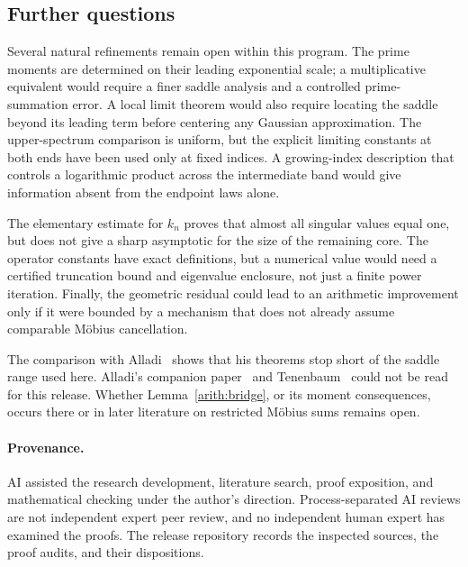 \subsection{Further questions}

Several natural refinements remain open within this program. The prime moments are determined on their leading exponential scale; a multiplicative equivalent would require a finer saddle analysis and a controlled prime-summation error. A local limit theorem would also require locating the saddle beyond its leading term before centering any Gaussian approximation. The upper-spectrum comparison is uniform, but the explicit limiting constants at both ends have been used only at fixed indices. A growing-index description that controls a logarithmic product across the intermediate band would give information absent from the endpoint laws alone.

The elementary estimate for $k_n$ proves that almost all singular values equal one, but does not give a sharp asymptotic for the size of the remaining core. The operator constants have exact definitions, but a numerical value would need a certified truncation bound and eigenvalue enclosure, not just a finite power iteration. Finally, the geometric residual could lead to an arithmetic improvement only if it were bounded by a mechanism that does not already assume comparable M\"obius cancellation.

The comparison with Alladi~\cite{alladi1982} shows that his theorems stop short of the saddle range used here. Alladi's companion paper~\cite{alladi1982b} and Tenenbaum~\cite{tenenbaum1990} could not be read for this release. Whether Lemma~\ref{arith:bridge}, or its moment consequences, occurs there or in later literature on restricted M\"obius sums remains open.

\paragraph{Provenance.}
AI assisted the research development, literature search, proof exposition, and mathematical checking under the author's direction. Process-separated AI reviews are not independent expert peer review, and no independent human expert has examined the proofs. The release repository records the inspected sources, the proof audits, and their dispositions.

